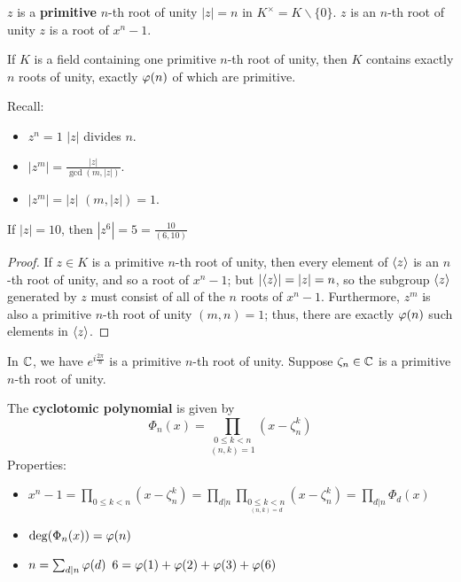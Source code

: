 \documentclass[12pt]{article}
\begin{document}
\rmk $z$ is a \textbf{primitive} $n$-th root of unity \ifnif $|z|=n$ in $K^{\times}=K\backslash \{0\}$.
\rmk $z$ is an $n$-th root of unity \ifnif $z$ is a root of $x^n-1$.

\begin{lemma}
    If $K$ is a field containing one primitive $n$-th root of unity, then $K$ contains exactly $n$ roots of unity, exactly $\varphi (n)$ of which are primitive.
\end{lemma}

\rmk Recall:
\begin{itemize}
    \item $z^n=1$ \ifnif $|z|$ divides $n$.
    \item $|z^m|=\frac{|z|}{\gcd(m,|z|)}$.
    \item $|z^m|=|z|$ \ifnif $(m,|z|)=1$.
\end{itemize}
\eg If $|z|=10$, then $|z^6|=5=\frac{10}{(6,10)}$
\begin{proof}
    If $z\in K$ is a primitive $n$-th root of unity, then every element of $\langle z \rangle$ is an $n$-th root of unity, and so a root of $x^n-1$; but $|\langle z \rangle|=|z|=n$, so the subgroup $\langle z \rangle$ generated by $z$  must consist of all of the $n$ roots of $x^n-1$. Furthermore, $z^m$ is also a primitive $n$-th root of unity \ifnif $(m,n)=1$; thus, there are exactly $\varphi (n)$ such elements in $\langle z \rangle$.
\end{proof}

In $\mathbb{C}$, we have $e^{i\frac{2\pi}{n}}$ is a primitive $n$-th root of unity. Suppose $\zeta_n\in \mathbb{C}$ is a primitive $n$-th root of unity.

 The \textbf{cyclotomic polynomial} is given by $$\Phi_n(x)=\underset{(n,k)=1}{\prod_{{0\leq k <n}}}(x-\zeta_n^k)$$
Properties: \begin{itemize}
    \item $x^n-1=\prod_{0\leq k <n}(x-\zeta_n^k)=\prod_{d|n}\prod_{\underset{(n,k)=d}{0\leq k<n}}(x-\zeta_n^k)=\prod_{d|n}\Phi_d(x)$
    \item $\deg(\Phi_n(x))=\varphi (n)$
    \item $n=\sum_{d|n}\varphi (d)$
    \eg $6=\varphi (1)+\varphi (2)+\varphi (3)+\varphi (6)$
\end{itemize}
\end{document}
